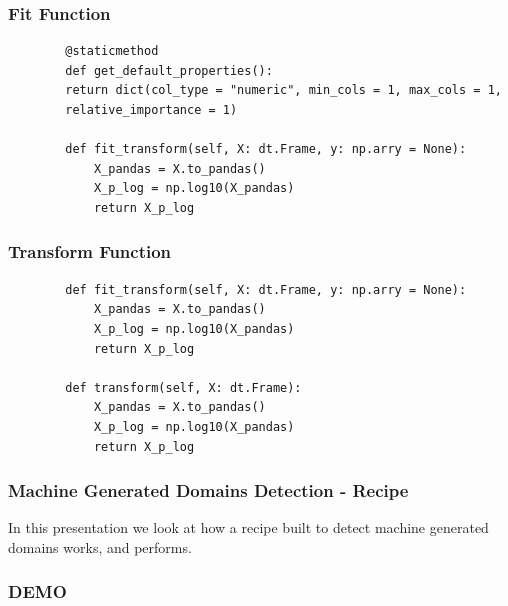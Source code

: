\documentclass[11pt,
               aspectratio=169,
               hyperref={colorlinks}
               ]{beamer}
\begin{document}
	\begin{frame}[fragile]
		\frametitle{Fit Function}
		\begin{verbatim}
		@staticmethod
		def get_default_properties():
		return dict(col_type = "numeric", min_cols = 1, max_cols = 1,
		relative_importance = 1)

		def fit_transform(self, X: dt.Frame, y: np.arry = None):
			X_pandas = X.to_pandas()
			X_p_log = np.log10(X_pandas)
			return X_p_log
		\end{verbatim}
\end{frame}
	\begin{frame}[fragile]
		\frametitle{Transform Function}
		\begin{verbatim}
		def fit_transform(self, X: dt.Frame, y: np.arry = None):
			X_pandas = X.to_pandas()
			X_p_log = np.log10(X_pandas)
			return X_p_log

		def transform(self, X: dt.Frame):
			X_pandas = X.to_pandas()
			X_p_log = np.log10(X_pandas)
			return X_p_log
		\end{verbatim}
\end{frame}
	\begin{frame}
		\frametitle{Machine Generated Domains Detection - Recipe}
		In this presentation we look at how a recipe built to detect machine generated domains works, and performs. 
	\end{frame}

	\begin{frame}
		\frametitle{DEMO}
	\end{frame}
\end{document}

